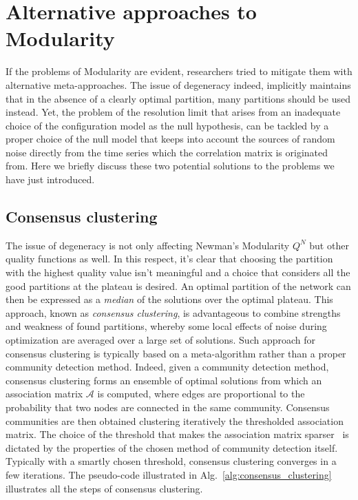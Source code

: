 \section{Alternative approaches to Modularity}
If the problems of Modularity are evident, researchers tried to mitigate them with alternative meta-approaches. The issue of degeneracy indeed, implicitly maintains that in the absence of a clearly optimal partition, many partitions should be used instead. Yet, the problem of the resolution limit that arises from an inadequate choice of the configuration model as the null hypothesis, can be tackled by a proper choice of the null model that keeps into account the sources of random noise directly from the time series which the correlation matrix is originated from. Here we briefly discuss these two potential solutions to the problems we have just introduced.

\subsection{Consensus clustering}
The issue of degeneracy is not only affecting Newman's Modularity $Q^N$ but other quality functions as well.
In this respect, it's clear that choosing the partition with the highest quality value isn't meaningful and a choice that considers all the good partitions at the plateau is desired. 
An optimal partition of the network can then be expressed as a \emph{median} of the solutions over the optimal plateau.
This approach, known as \emph{consensus clustering}, is advantageous to combine strengths and weakness of found partitions, whereby some local effects of noise during optimization are averaged over a large set of solutions.
Such approach for consensus clustering is typically based on a meta-algorithm rather than a proper community detection method. Indeed, given a community detection method, consensus clustering forms an ensemble of optimal solutions from which an association matrix $\mathcal{A}$ is computed, where edges are proportional to the probability that two nodes are connected in the same community. 
Consensus communities are then obtained clustering iteratively the thresholded association matrix. The choice of the threshold that makes the association matrix sparser~\cite{lancichinetti2012} is dictated by the properties of the chosen method of community detection itself. Typically with a smartly chosen threshold, consensus clustering converges in a few iterations. The pseudo-code illustrated in Alg.~\ref{alg:consensus_clustering} illustrates all the steps of consensus clustering.

